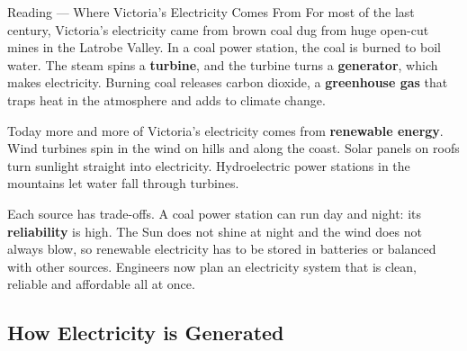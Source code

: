 \label{read:5}

\begin{readingbox}{Reading --- Where Victoria's Electricity Comes From}
For most of the last century, Victoria's electricity came from brown coal dug from huge open-cut mines in the Latrobe Valley. In a coal power station, the coal is burned to boil water. The steam spins a \textbf{turbine}, and the turbine turns a \textbf{generator}, which makes electricity. Burning coal releases carbon dioxide, a \textbf{greenhouse gas} that traps heat in the atmosphere and adds to climate change.

Today more and more of Victoria's electricity comes from \textbf{renewable energy}. Wind turbines spin in the wind on hills and along the coast. Solar panels on roofs turn sunlight straight into electricity. Hydroelectric power stations in the mountains let water fall through turbines.

Each source has trade-offs. A coal power station can run day and night: its \textbf{reliability} is high. The Sun does not shine at night and the wind does not always blow, so renewable electricity has to be stored in batteries or balanced with other sources. Engineers now plan an electricity system that is clean, reliable and affordable all at once.
\end{readingbox}

\rcreset
{}

\label{theory:5}

\subsection{How Electricity is Generated}\label{sub:5.1}

\begin{center}
\end{center}

